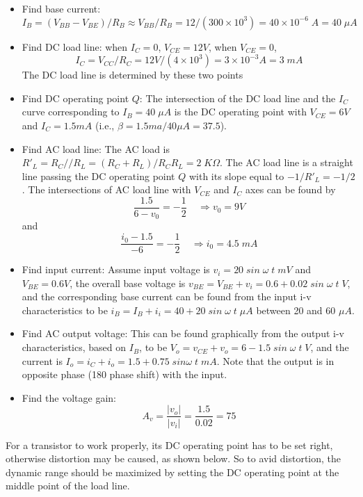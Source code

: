 \begin{itemize}
\item Find base current:
\[	I_B=(V_{BB}-V_{BE})/R_B \approx V_{BB}/R_B=12/(300\times 10^3)
	=40\times 10^{-6}\; A=40\;\mu A	\]
\item Find DC load line: when $I_C=0$, $V_{CE}=12V$, when $V_{CE}=0$,
\[	I_C=V_{CC}/R_C=12V/(4\times 10^3)=3\times 10^{-3}A=3 \;mA	\]
	The DC load line is determined by these two points
\item Find DC operating point $Q$: 
	The intersection of the DC load line and the $I_C$ curve 
	corresponding to $I_B=40 \;\mu A$ is the DC operating point with 
	$V_{CE}=6V$ and $I_C=1.5 mA$ (i.e., $\beta=1.5ma/40 \mu A=37.5$).
\item Find AC load line: 
	The AC load is $R'_L=R_C//R_L=(R_C+R_L)/R_CR_L=2\;K\Omega$. The AC load
	line is a straight line passing the DC operating point $Q$ with its
	slope equal to $-1/R'_L=-1/2$. The intersections of AC load line 
	with $V_{CE}$ and $I_C$ axes can be found by
\[	\frac{1.5}{6-v_0}=-\frac{1}{2}\;\;\;\;\Longrightarrow v_0=9V \]
	and 
\[	\frac{i_0-1.5}{-6}=-\frac{1}{2}\;\;\;\;\Longrightarrow i_0=4.5\;mA \]
\item Find input current:
	Assume input voltage is $v_i=20\; sin\;\omega\;t\;mV$ and $V_{BE}=0.6V$, 
	the overall base voltage is $v_{BE}=V_{BE}+v_i=0.6+0.02\;sin\;\omega\;t\;V$, 
	and the corresponding base current can be found from the input i-v 
	characteristics to be $i_B=I_B+i_i=40+20\; sin\;\omega\;t\;\mu A$ 
	between 20 and 60 $\mu A$.
\item Find AC output voltage: This can be found graphically from the 
	output i-v characteristics, based on $I_B$, to be 
	$V_o=v_{CE}+v_o=6-1.5 \;sin\;\omega\; t\; V$, and the current is
	$I_o=i_C+i_o=1.5+ 0.75 \;sin\omega \;t\; mA$.
	Note that the output is in opposite phase (180 phase shift) with 
	the input. 
\item Find the voltage gain:
	\[ A_v=\frac{|v_o|}{|v_i|}=\frac{1.5}{0.02}=75	\]
\end{itemize}


For a transistor to work properly, its DC operating point has to be set right,
otherwise distortion may be caused, as shown below. So to avid distortion, the
dynamic range should be maximized by setting the DC operating point at the 
middle point of the load line.


